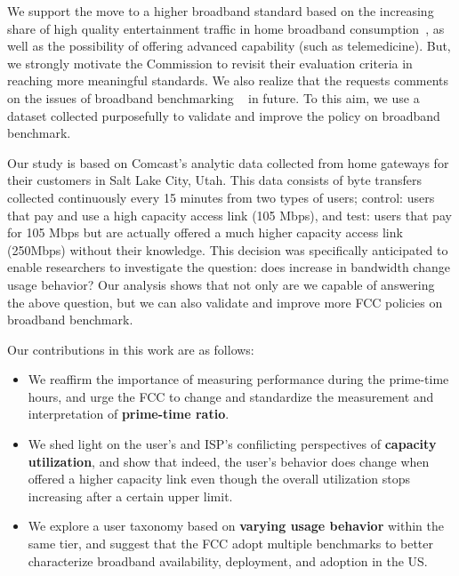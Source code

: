 We support the move to a higher broadband standard based on the increasing 
share of high quality entertainment traffic in home broadband 
consumption~\cite{sandvine2014report1,sandvine2014report2}, as well as the 
possibility of offering advanced capability (such as telemedicine). But, we 
strongly motivate the Commission to revisit their evaluation criteria in 
reaching more meaningful standards. We also realize that the \FCC requests 
comments on the issues of broadband benchmarking ~ in 
future. To this aim, we use a dataset collected purposefully to validate and 
improve the \FCC policy on broadband benchmark.

Our study is based on Comcast’s analytic data collected from home gateways for their customers in
Salt Lake City, Utah. This data consists of byte transfers collected continuously every 15 minutes
from two types of users; control: users that pay and use a high capacity access link (105 Mbps), and
test: users that pay for 105 Mbps but are actually offered a much higher capacity access link
(250Mbps) without their knowledge. This decision was specifically anticipated to enable researchers
to investigate the question: does increase in bandwidth change usage behavior? 
Our analysis shows that not only are we capable of answering the above 
question, but we can also validate and improve more FCC policies on broadband 
benchmark.

Our contributions in this work are as follows:
\begin{itemize}
\itemsep0em
\item We reaffirm the importance of measuring performance during the 
prime-time hours, and urge the FCC to change and standardize 
the measurement and interpretation of \textbf{prime-time ratio}. 
\item We shed light on the user's and ISP's confilicting perspectives 
of \textbf{capacity utilization}, and show that indeed, the user's behavior 
does change when offered a higher capacity link even though the 
overall utilization stops increasing after a certain upper limit.
\item We explore a user taxonomy based on \textbf{varying usage behavior} 
within the same tier, and suggest that the FCC adopt multiple benchmarks 
to better characterize broadband availability, deployment, and adoption in the 
US.
\end{itemize}

